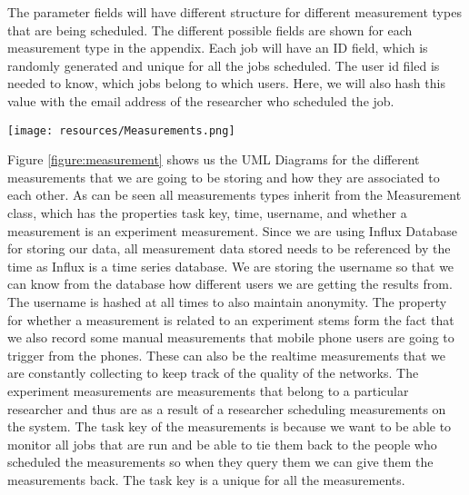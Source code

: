 The parameter fields will have different structure for different measurement types that are being scheduled.
The different possible fields are shown for each measurement type in the appendix.
Each job will have an ID field, which is randomly generated and unique for all the jobs scheduled.
The user id filed is needed to know, which jobs belong to which users.
Here, we will also hash this value with the email address of the researcher who scheduled the job.
\begin{figure*}
    \begin{center}
        \texttt{[image: resources/Measurements.png]}
    \end{center}
    \caption{Showing UML class diagrams of the different types of measurements and their associations.}
    \label{figure:measurement}
\end{figure*}

Figure \ref{figure:measurement} shows us the UML Diagrams for the different measurements that we are going to be storing and how they are associated to each other.
As can be seen all measurements types inherit from the Measurement class, which has the properties task key, time, username, and whether a measurement is an experiment measurement.
Since we are using Influx Database for storing our data, all measurement data stored needs to be referenced by the time as Influx is a time series database.
We are storing the username so that we can know from the database how different users we are getting the results from.
The username is hashed at all times to also maintain anonymity.
The property for whether a measurement is related to an experiment stems form the fact that we also record some manual measurements that mobile phone users are going to trigger from the phones.
These can also be the realtime measurements that we are constantly collecting to keep track of the quality of the networks.
The experiment measurements are measurements that belong to a particular researcher and thus are as a result of a researcher scheduling measurements on the system.
The task key of the measurements is because we want to be able to monitor all jobs that are run and be able to tie them back to the people who scheduled the measurements so when they query them we can give them the measurements back.
The task key is a unique for all the measurements.

